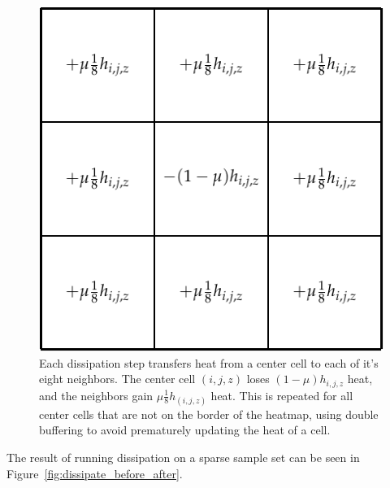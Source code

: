 \documentclass[11pt, oneside]{report}
\begin{document}

\begin{figure}
\centering
\includegraphics[scale=1]{figs-tileheat/disspate2}
\caption{Each dissipation step transfers heat from a center cell to each of it's eight neighbors. The center cell $(i,j,z)$ loses $(1 - \mu) h_{i,j,z}$ heat, and the neighbors gain $\mu \frac{1}{8} h_(i,j,z)$ heat. This is repeated for all center cells that are not on the border of the heatmap, using double buffering to avoid prematurely updating the heat of a cell.}
\label{fig:dissipate}
\end{figure}

The result of running dissipation on a sparse sample set can be seen in Figure~\ref{fig:dissipate_before_after}.
\end{document}
